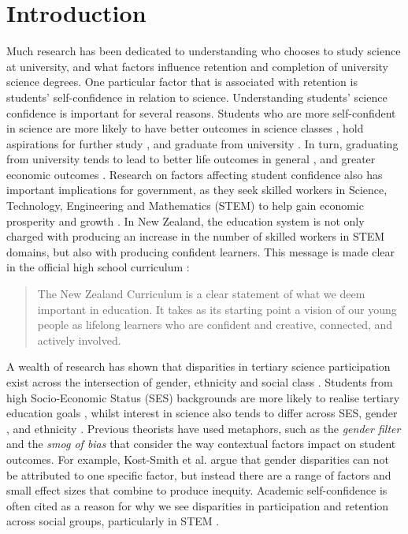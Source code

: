 \documentclass[smallextended]{svjour3}       %
\begin{document}
\section*{Introduction}
\label{intro}
Much research has been dedicated to understanding who chooses to study science at university, and what factors influence retention and completion of university science degrees. One particular factor that is associated with retention is students' self-confidence in relation to science. Understanding students' science confidence is important for several reasons. Students who are more self-confident in science are more likely to have better outcomes in science classes \cite{uccar2017role,tighezza2014modeling,chang2008science,peters2013examining}, hold aspirations for further study \cite{mujtaba2018students}, and graduate from university \cite{larson2015predicting}. In turn, graduating from university tends to lead to better life outcomes in general \cite{Oreopoulos_2007}, and greater economic outcomes \cite{norton2016mapping,mahoney2013moving}. Research on factors affecting student confidence also has important implications for government, as they seek skilled workers in Science, Technology, Engineering and Mathematics (STEM) to help gain economic prosperity and growth \cite{pricewaterhousecoopers2015smart}. In New Zealand, the education system is not only charged with producing an increase in the number of skilled workers in STEM domains, but also with producing confident learners. This message is made clear in the official high school curriculum \cite{NZC}:

\begin{quote}
   The New Zealand Curriculum is a clear statement of what we deem important in education. It takes as its starting point a vision of our young people as lifelong learners who are confident and creative, connected, and actively involved.
\end{quote} 

A wealth of research has shown that disparities in tertiary science participation exist across the intersection of gender, ethnicity and social class \cite{reynolds2011change,meehan2017explaining}. Students from high Socio-Economic Status (SES) backgrounds are more likely to realise tertiary education goals \cite{reynolds2011change}, whilst interest in science also tends to differ across SES, gender \cite{cheryan2017some}, and ethnicity \cite{Wong2016ScienceStudents}. Previous theorists have used metaphors, such as the \textit{gender filter} \cite{Blickenstaff_2005} and the \textit{smog of bias} \cite{Kost_Smith_2010} that consider the way contextual factors impact on student outcomes. For example, Kost-Smith et al. \citeyear{Kost_Smith_2010} argue that gender disparities can not be attributed to one specific factor, but instead there are a range of factors and small effect sizes that combine to produce inequity. Academic self-confidence is often cited as a reason for why we see disparities in participation and retention across social groups, particularly in STEM \cite{Blickenstaff_2005}.  
\end{document}
